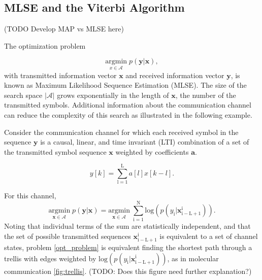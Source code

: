\documentclass[12pt,a4paper]{report}
\begin{document}
\subsection{MLSE and the Viterbi Algorithm}
(TODO Develop MAP vs MLSE here)

The optimization problem

\begin{equation}\label{opt_problem}
\underset{x \in \textit{$\mathcal{A}$}}{\text{argmin}} \; p(\mathbf{y}|\mathbf{x}),
\end{equation}
 with transmitted information vector $\mathbf{x}$ and received information vector $\mathbf{y}$, is known as Maximum Likelihood Sequence Estimation (MLSE). 
The size of the search space $|\mathcal{A}|$ grows exponentially in the length of $\mathbf{x}$, the number of the transmitted symbols. Additional information about the communication channel can reduce the complexity of this search as illustrated in the following example.
\par
Consider the communication channel for which each received symbol in the sequence $\mathbf{y}$ is a causal, linear, and time invariant (LTI) combination of a set of the transmitted symbol sequence $\mathbf{x}$ weighted by coefficients $\mathbf{a}$. 

\begin{equation*}
y[k] = \sum_{\mathrm{l=1}}^{\mathrm{L}} a[l]x[k-l].
\end{equation*}

For this channel,
\begin{equation*}
\underset{\mathbf{x}\in\mathcal{A}}{\text{argmin}} \; p(\mathbf{y}|\mathbf{x})=
\underset{\mathbf{x}\in\mathcal{A}}{\text{argmin}} \; \sum_{\mathrm{i=1}}^{\mathrm{N}}\text{log}(p(y_{\mathrm{i}}|\mathbf{x}_{\mathrm{i-L+1}}^{\mathrm{i}}) ).
\end{equation*}
Noting that individual terms of the sum are statistically independent, and that the set of possible transmitted sequences $\mathbf{x}_{\mathrm{i-L+1}}^{\mathrm{i}}$ is equivalent to a set of channel states, problem \eqref{opt_problem} is equivalent finding the shortest path through a trellis  with edges weighted by $\text{log}(p(y_{\mathrm{i}}|\mathbf{x}_{\mathrm{i-L+1}}^{\mathrm{i}}))$, as in molecular communication \ref{fig:trellis}.
(TODO: Does this figure need further explanation?)
\end{document}
